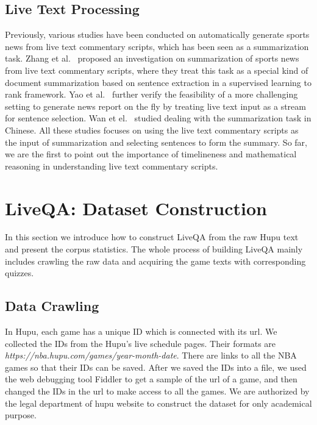  \subsection{Live Text Processing}
 
 Previously, various studies have been conducted on automatically generate sports news from live text commentary scripts, which has been seen as a summarization task. Zhang et al.~ proposed an investigation on summarization of sports news from live text commentary scripts, where they treat this task as a special kind of document summarization based on sentence extraction in a supervised learning to rank framework. Yao et al.~ further verify the feasibility of a more challenging setting to generate news report on the fly by treating live text input as a stream for sentence selection. Wan et el.~ studied dealing with the summarization task in Chinese. All these studies focuses on using the live text commentary scripts as the input of summarization and selecting sentences to form the summary. So far, we are the first to point out the importance of timelineness and mathematical reasoning in understanding live text commentary scripts.

\section{LiveQA: Dataset Construction}
In this section we introduce how to construct LiveQA from the raw Hupu text and present the corpus statistics.
The whole process of building LiveQA mainly includes  crawling the raw data and acquiring the game texts with corresponding quizzes.
\subsection{Data Crawling}
In Hupu, each game has a unique ID which is connected with its url. We collected the IDs from the Hupu's live schedule pages. Their formats are {\em https://nba.hupu.com/games/year-month-date}. There are links to all the NBA games so that their IDs can be saved. After we saved the IDs into a file, we used the web debugging tool Fiddler to get a sample of the url of a game, and then changed the IDs in the url to make access to all the games. We are authorized by the legal department of hupu website to construct the dataset for only academical purpose.

